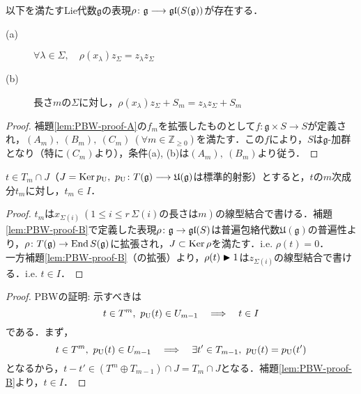 \documentclass[rep_main]{subfiles}
\begin{document}
\begin{mylem}[label=lem:PBW-proof-B]{}
	以下を満たすLie代数$\mathfrak{g}$の表現$\rho \colon \mathfrak{g} \longrightarrow \mathfrak{gl} (S(\mathfrak{g}))$が存在する．
	\begin{description}
		\item[(a)] $\forall \lambda \in \Sigma,\quad  \rho(x_\lambda)z_\Sigma = z_\lambda z_\Sigma$
		\item[(b)] 長さ$m$の$\Sigma$に対し，$\rho(x_\lambda)z_\Sigma + S_m = z_\lambda z_\Sigma + S_m$
	\end{description}
\end{mylem}
\begin{proof}
	補題\ref{lem:PBW-proof-A}の$f_m$を拡張したものとして$f\colon \mathfrak{g} \times S \to S$が定義され，$(A_m),\ (B_m),\ (C_m)\ (\forall m \in \mathbb{Z}_{\geq 0})$を満たす．この$f$により，$S$は$\mathfrak{g}$-加群となり（特に$(C_m)$より），条件(a), (b)は$(A_m),\ (B_m)$より従う．
\end{proof}
\begin{mylem}[label=lem:PBW-proof-C]{}
	$t \in T_m \cap J$（$J = \operatorname{Ker} p_\text{U},\ p_\text{U}\colon T(\mathfrak{g}) \longrightarrow \mathfrak{U}(\mathfrak{g})$は標準的射影）とすると，$t$の$m$次成分$t_m$に対し，$t_m \in I$．
\end{mylem}
\begin{proof}
	$t_m$は$x_{\Sigma(i)}\ (1 \leq i \leq r\, \Sigma(i)\text{の長さは}m)$の線型結合で書ける．補題\ref{lem:PBW-proof-B}で定義した表現$\rho\colon \mathfrak{g} \to \mathfrak{gl}(S)$は普遍包絡代数$\mathfrak{U}(\mathfrak{g})$の普遍性より，$\rho\colon T(\mathfrak{g}) \to \operatorname{End} S(\mathfrak{g})$に拡張され，$J \subset \operatorname{Ker}\rho$を満たす．i.e. $\rho(t) = 0$．\\
	一方補題\ref{lem:PBW-proof-B}（の拡張）より，$\rho(t) \blacktriangleright 1$は$z_{\Sigma(i)}$の線型結合で書ける．i.e. $t \in I$．
\end{proof}
\begin{proof}
	PBWの証明: 示すべきは
	\begin{equation}
		t \in T^m,\ p_\text{U}(t) \in U_{m-1}  \quad \Longrightarrow \quad  t \in I
	\end{equation}
	である．まず，
	\begin{equation}
		t \in T^m,\ p_\text{U}(t) \in U_{m-1}  \quad \Longrightarrow \quad  \exists t' \in T_{m-1},\ p_\text{U}(t) = p_\text{U}(t')
	\end{equation}
	となるから，$t - t' \in (T^m \oplus T_{m-1}) \cap J = T_m \cap J$となる．補題\ref{lem:PBW-proof-B}より，$t \in I$．
\end{proof}
\end{document}

